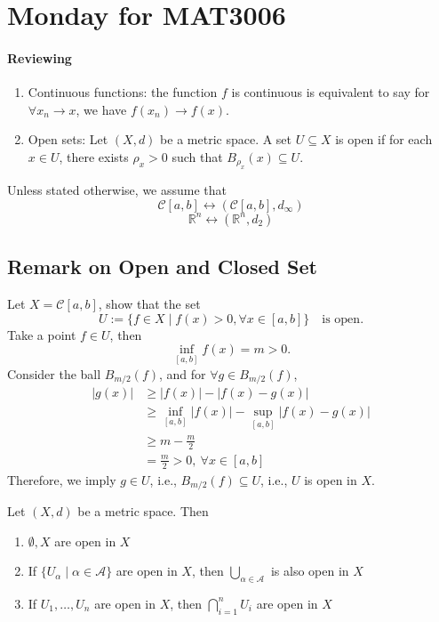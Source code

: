 \section{Monday for MAT3006}
\paragraph{Reviewing}
\begin{enumerate}
\item
Continuous functions: the function $f$ is continuous is equivalent to say for $\forall x_n\to x$, we have $f(x_n)\to f(x)$.
\item
Open sets: Let $(X,d)$ be a metric space. A set $U\subseteq X$ is open if for each $x\in U$, there exists $\rho_x>0$ such that $B_{\rho_x}(x)\subseteq U$.
\end{enumerate}

\begin{remark}
Unless stated otherwise, we assume that 
\[
\mathcal{C}[a,b]\longleftrightarrow
(\mathcal{C}[a,b],d_\infty)
\]
\[
\mathbb{R}^n\longleftrightarrow
(\mathbb{R}^n,d_2)
\]
\end{remark}
\subsection{Remark on Open and Closed Set}

\begin{example}\label{Exp:2:6}
Let $X=\mathcal{C}[a,b]$, show that the set 
\[
U:=\{f\in X\mid f(x)>0,\forall x\in[a,b]\}\quad\text{is open}.
\]
Take a point $f\in U$, then
\[
\inf_{[a,b]}f(x)=m>0.
\]
Consider the ball $B_{m/2}(f)$, and for $\forall g\in B_{m/2}(f)$,
\begin{align*}
|g(x)|&\ge |f(x)|-|f(x)-g(x)|\\
&\ge\inf_{[a,b]}|f(x)|-\sup_{[a,b]}|f(x)-g(x)|\\
&\ge m-\frac{m}{2}\\&=\frac{m}{2}>0,\ \forall x\in[a,b]
\end{align*}
Therefore, we imply $g\in U$, i.e., $B_{m/2}(f)\subseteq U$, i.e., $U$ is open in $X$.
\end{example}

\begin{proposition}
Let $(X,d)$ be a metric space. Then 
\begin{enumerate}
\item
$\emptyset,X$ are open in $X$
\item
If $\{U_\alpha\mid\alpha\in\mathcal{A}\}$ are open in $X$, then $\bigcup_{\alpha\in\mathcal{A}}$ is also open in $X$
\item
If $U_1,\dots,U_n$ are open in $X$, then $\bigcap_{i=1}^nU_i$ are open in $X$
\end{enumerate}
\end{proposition}


